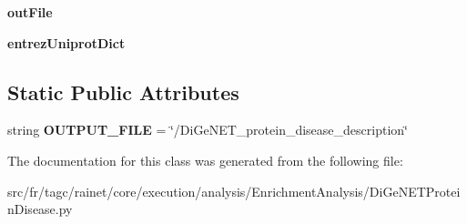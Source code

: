 \begin{DoxyCompactItemize}
\item 
\hypertarget{classsrc_1_1fr_1_1tagc_1_1rainet_1_1core_1_1execution_1_1analysis_1_1EnrichmentAnalysis_1_1DiGeNfa669edf4ec9ad533f4e4738eca5d84d_af37512a51a3acd315b7cc175b534a955}{{\bfseries out\-File}}\label{classsrc_1_1fr_1_1tagc_1_1rainet_1_1core_1_1execution_1_1analysis_1_1EnrichmentAnalysis_1_1DiGeNfa669edf4ec9ad533f4e4738eca5d84d_af37512a51a3acd315b7cc175b534a955}

\item 
\hypertarget{classsrc_1_1fr_1_1tagc_1_1rainet_1_1core_1_1execution_1_1analysis_1_1EnrichmentAnalysis_1_1DiGeNfa669edf4ec9ad533f4e4738eca5d84d_a6e7f0e694b0bbad7405d0ba5ccc02633}{{\bfseries entrez\-Uniprot\-Dict}}\label{classsrc_1_1fr_1_1tagc_1_1rainet_1_1core_1_1execution_1_1analysis_1_1EnrichmentAnalysis_1_1DiGeNfa669edf4ec9ad533f4e4738eca5d84d_a6e7f0e694b0bbad7405d0ba5ccc02633}

\end{DoxyCompactItemize}
\subsection*{Static Public Attributes}
\begin{DoxyCompactItemize}
\item 
\hypertarget{classsrc_1_1fr_1_1tagc_1_1rainet_1_1core_1_1execution_1_1analysis_1_1EnrichmentAnalysis_1_1DiGeNfa669edf4ec9ad533f4e4738eca5d84d_a3f8736ca9ac81864cbeaf54ee3100cf2}{string {\bfseries O\-U\-T\-P\-U\-T\-\_\-\-F\-I\-L\-E} = \char`\"{}/Di\-Ge\-N\-E\-T\-\_\-protein\-\_\-disease\-\_\-description\char`\"{}}\label{classsrc_1_1fr_1_1tagc_1_1rainet_1_1core_1_1execution_1_1analysis_1_1EnrichmentAnalysis_1_1DiGeNfa669edf4ec9ad533f4e4738eca5d84d_a3f8736ca9ac81864cbeaf54ee3100cf2}

\end{DoxyCompactItemize}


The documentation for this class was generated from the following file\-:\begin{DoxyCompactItemize}
\item 
src/fr/tagc/rainet/core/execution/analysis/\-Enrichment\-Analysis/Di\-Ge\-N\-E\-T\-Protein\-Disease.\-py\end{DoxyCompactItemize}
